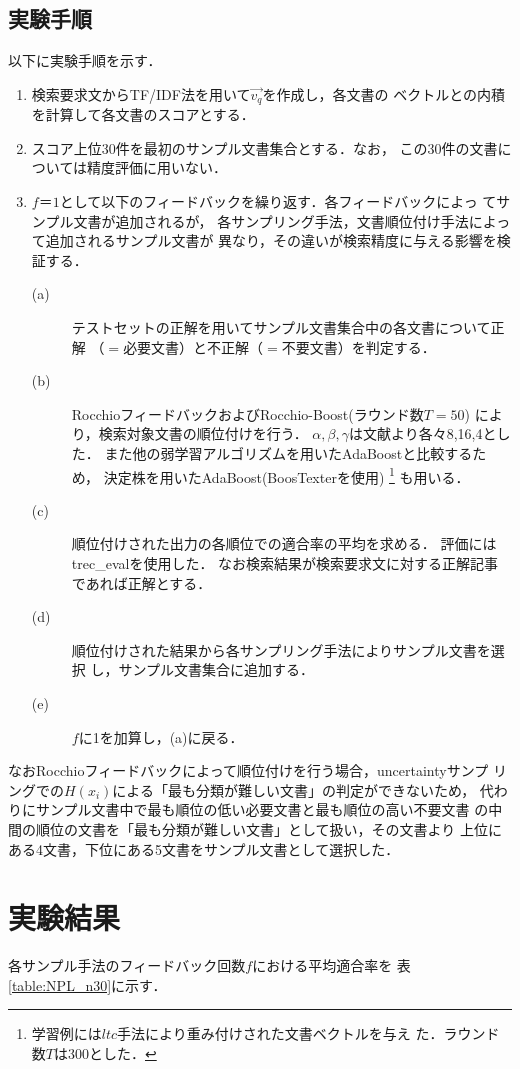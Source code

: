 \subsection{実験手順}
以下に実験手順を示す．
\begin{enumerate}
\item 検索要求文からTF/IDF法を用いて$\vec{v_{q}}$を作成し，各文書の
ベクトルとの内積を計算して各文書のスコアとする．
\label{enu:normal_search}
\item スコア上位30件を最初のサンプル文書集合とする．なお，
この30件の文書については精度評価に用いない．
\item $f＝1$として以下のフィードバックを繰り返す．各フィードバックによっ
てサンプル文書が追加されるが，
各サンプリング手法，文書順位付け手法によって追加されるサンプル文書が
異なり，その違いが検索精度に与える影響を検証する．
\begin{description}
\item[(a)] テストセットの正解を用いてサンプル文書集合中の各文書について正解
（$=$必要文書）と不正解（$=$不要文書）を判定する．
\label{enu:sample_doc}
\item[(b)] RocchioフィードバックおよびRocchio-Boost(ラウンド数$T=50$)
により，検索対象文書の順位付けを行う．
$\alpha,\beta,\gamma$は文献\cite{bib:Buckley}より各々8,16,4とした．
また他の弱学習アルゴリズムを用いたAdaBoostと比較するため，
決定株を用いたAdaBoost(BoosTexterを使用\cite{bib:Boostexter})
\footnote{学習例には$ltc$手法により重み付けされた文書ベクトルを与え
た．ラウンド数$T$は300とした．}
も用いる．
\item[(c)] 順位付けされた出力の各順位での適合率の平均を求める．
評価にはtrec\_eval\cite{bib:trec_eval}を使用した．
なお検索結果が検索要求文に対する正解記事であれば正解とする．
\item[(d)] 順位付けされた結果から各サンプリング手法によりサンプル文書を選択
し，サンプル文書集合に追加する．
\item[(e)] $f$に1を加算し，(a)に戻る．
\end{description}
\end{enumerate}

なおRocchioフィードバックによって順位付けを行う場合，uncertaintyサンプ
リングでの$H(x_{i})$による「最も分類が難しい文書」の判定ができないため，
代わりにサンプル文書中で最も順位の低い必要文書と最も順位の高い不要文書
の中間の順位の文書を「最も分類が難しい文書」として扱い，その文書より
上位にある4文書，下位にある5文書をサンプル文書として選択した．

\section{実験結果}
各サンプル手法のフィードバック回数$f$における平均適合率を
表\ref{table:NPL_n30}に示す．

